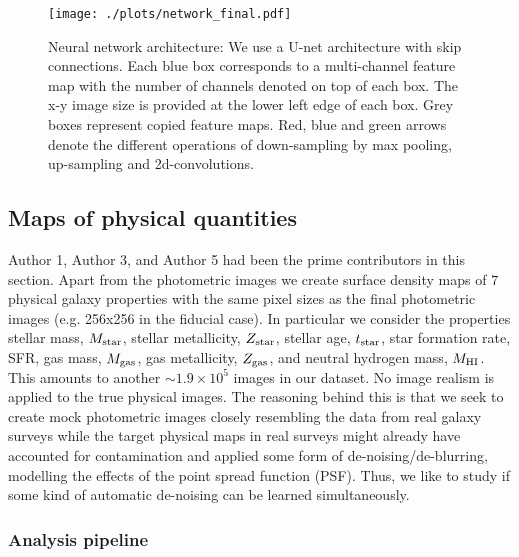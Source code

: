 \documentclass[conference]{IEEEtran}
\begin{document}
\begin{figure}
\begin{center}
\texttt{[image: ./plots/network\_final.pdf]}
\end{center}
\vspace{-.35cm}
\caption{Neural network architecture: We use a U-net architecture with skip connections. Each blue box corresponds to a multi-channel feature map with the number of channels denoted on top of each box. The x-y image size is provided at the lower left edge of each box. Grey boxes represent copied feature maps. Red, blue and green arrows denote the different operations of down-sampling by max pooling, up-sampling and 2d-convolutions.}
\label{fig:network}
\end{figure}

\subsection{Maps of physical quantities}

Author 1, Author 3, and Author 5 had been the prime contributors in this section. Apart from the photometric images we create surface density maps of $7$ physical galaxy properties with the same pixel sizes as the final photometric images (e.g. 256x256 in the fiducial case). In particular we consider the properties stellar mass, $M_{\rm star}$, stellar metallicity, $Z_{\rm star}$, stellar age, $t_{\rm star}$, star formation rate, SFR, gas mass, $M_{\rm gas}$, gas metallicity, $Z_{\rm gas}$, and neutral hydrogen mass, $M_{\rm HI}$. This amounts to another $\sim 1.9\times 10^5$ images in our dataset. No image realism is applied to the true physical images. The reasoning behind this is that we seek to create mock photometric images closely resembling the data from real galaxy surveys while the target physical maps in real surveys might already have accounted for contamination and applied some form of de-noising/de-blurring, modelling the effects of the point spread function (PSF). Thus, we like to study if some kind of automatic de-noising can be learned simultaneously. 

\subsubsection{Analysis pipeline}
\label{subsec:analysis}
\end{document}
